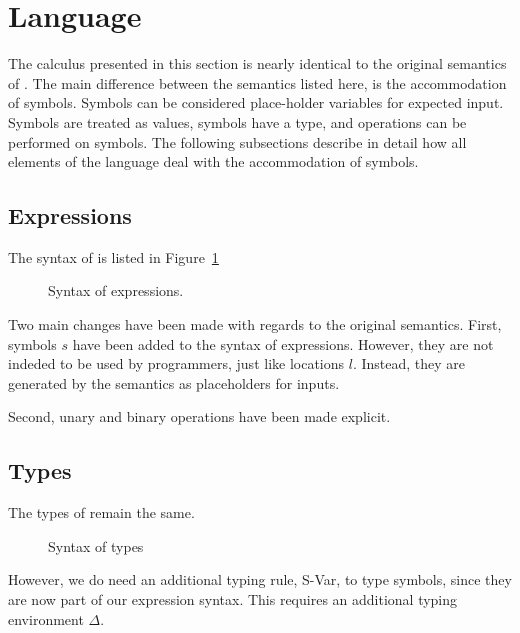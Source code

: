 

\section{Language}
\label{sec:language}

The calculus presented in this section is nearly identical to the original semantics of \TOPHAT.
The main difference between the semantics listed here, is the accommodation of symbols.
Symbols can be considered place-holder variables for expected input.
Symbols are treated as values, symbols have a type, and operations can be performed on symbols.
The following subsections describe in detail how all elements of the \TOPHAT language deal with the accommodation of symbols.


\subsection{Expressions}
\label{expressions}

The syntax of \TOPHAT is listed in Figure~\ref{fig:syntaxtophat}

\begin{figure}




\caption{Syntax of \TOPHAT expressions.}
  \label{fig:syntaxtophat}
\end{figure}

Two main changes have been made with regards to the original \TOPHAT semantics.
First, symbols $s$ have been added to the syntax of expressions.
However, they are not indeded to be used by programmers, just like locations $l$.
Instead, they are generated by the semantics as placeholders for inputs.

Second, unary and binary operations have been made explicit.

\subsection{Types}

The types of \TOPHAT remain the same.

\begin{figure}
\caption{Syntax of \TOPHAT types}
  \label{fig:syntaxtypes}
\end{figure}

However, we do need an additional typing rule, S-Var, to type symbols,
since they are now part of our expression syntax.
This requires an additional typing environment $\Delta$.

